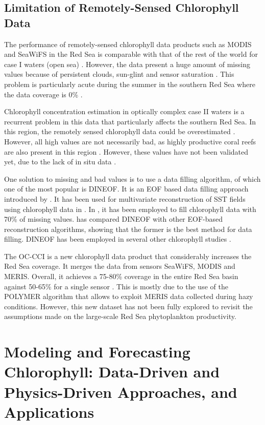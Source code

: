 \subsection{Limitation of Remotely-Sensed Chlorophyll Data}

The performance of remotely-sensed chlorophyll data products such as MODIS and SeaWiFS in the Red Sea is comparable with that of the rest of the world for case I waters (open sea) \cite{Brewin2013}. However, the data present a huge amount of missing values because of persistent clouds, sun-glint and sensor saturation \cite{Racault}. This problem is particularly acute during the summer in the southern Red Sea where the data coverage is 0\% \cite{Racault}.

Chlorophyll concentration estimation in optically complex case II waters is a recurrent problem in this data that particularly affects the southern Red Sea. In this region, the remotely sensed chlorophyll data could be overestimated \cite{Raitsos2013}. However, all high values are not necessarily bad, as highly productive coral reefs are also present in this region \cite{Raitsos2013}. However, these values have not been validated yet, due to the lack of in situ data \cite{Raitsos2013}.

One solution to missing and bad values is to use a data filling algorithm, of which one of the most popular is DINEOF. It is an EOF based data filling approach introduced by \cite{Beckers2003}. It has been used for multivariate reconstruction of SST fields using chlorophyll data in \cite{Alvera2007}. In \cite{Sicarjobs2011}, it has been employed to fill chlorophyll data with 70\% of missing values. \cite{Taylor2013} has compared DINEOF with other EOF-based reconstruction algorithms, showing that the former is the best method for data filling. DINEOF has been employed in several other chlorophyll studies \cite{Miles2010, Waite2013}.

The OC-CCI is a new chlorophyll data product that considerably increases the Red Sea coverage. It merges the data from sensors SeaWiFS, MODIS and MERIS. Overall, it achieves a 75-80\% coverage in the entire Red Sea basin against 50-65\% for a single sensor \cite{Racault}. This is mostly due to the use of the POLYMER algorithm \cite{Steinmetz2011} that allows to exploit MERIS data collected during hazy conditions. However, this new dataset has not been fully explored to revisit the assumptions made on the large-scale Red Sea phytoplankton productivity.

\section{Modeling and Forecasting Chlorophyll: Data-Driven and Physics-Driven Approaches, and Applications}

